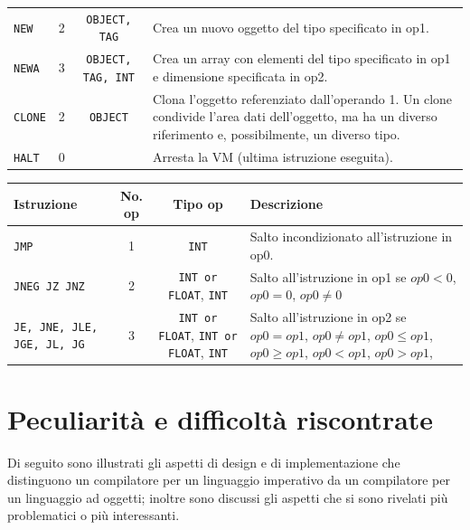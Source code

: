\documentclass[a4paper, 11pt]{article}
\newcommand{\code}[1]{\scriptsize{\texttt{#1}}\normalsize}
\begin{document}
\begin{center}
\begin{tabular}{p{2.2 cm}|c|c|p{5.5 cm}}
\code{NEW} & 2 & \code{OBJECT, TAG} & \footnotesize{Crea un nuovo oggetto del tipo specificato in op1.}\\
\code{NEWA} & 3 & \code{OBJECT, TAG, INT} & \footnotesize{Crea un array con elementi del tipo specificato in op1 e dimensione specificata in op2.}\\

\code{CLONE} & 2 & \code{OBJECT} & \footnotesize{Clona l'oggetto referenziato dall'operando 1. Un clone condivide l'area dati dell'oggetto, ma ha un diverso riferimento e, possibilmente, un diverso tipo.}\\

\code{HALT} & 0 &  & \footnotesize{Arresta la VM (ultima istruzione eseguita).}\\


\hline
\end{tabular}
\end{center}

\begin{center}
\begin{tabular}{p{2.2 cm}|c|c|p{5.5 cm}}
\hline
\textbf{Istruzione} & \textbf{No. op} & \textbf{Tipo op} & \textbf{Descrizione}\\
\hline


\code{JMP} & 1 & \code{INT} & \footnotesize{Salto incondizionato all'istruzione in op0.}\\
\code{JNEG JZ JNZ} & 2 & \code{INT or FLOAT}, \code{INT} & \footnotesize{Salto all'istruzione in op1 se $op0<0$, $op0=0$, $op0\neq 0$}\\
\code{JE, JNE, JLE, JGE, JL, JG} & 3 & \code{INT or FLOAT}, \code{INT or FLOAT}, \code{INT} & \footnotesize{ Salto all'istruzione in op2 se $op0 = op1$, $op0 \neq op1$, $op0 \leq op1$, $op0 \geq op1$, $op0 < op1$, $op0 > op1$, }\\

\hline
\end{tabular}
\end{center}

\section{Peculiarit\`a e difficolt\`a riscontrate}

Di seguito sono illustrati gli aspetti di design e di implementazione che distinguono 
un compilatore per un linguaggio imperativo da un compilatore per un linguaggio ad oggetti; 
inoltre sono discussi gli aspetti che si sono rivelati pi\`u problematici o pi\`u interessanti.
\end{document}
